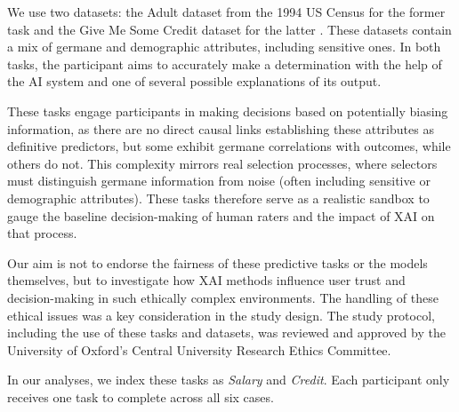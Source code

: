 \noindent We use two datasets: the Adult dataset from the 1994 US Census for the former task and the Give Me Some Credit dataset for the latter \cite{kohavi_scaling_1996, GiveMeSomeCredit}. These datasets contain a mix of germane and demographic attributes, including sensitive ones. In both tasks, the participant aims to accurately make a determination with the help of the AI system and one of several possible explanations of its output. 

These tasks engage participants in making decisions based on potentially biasing information, as there are no direct causal links establishing these attributes as definitive predictors, but some exhibit germane correlations with outcomes, while others do not. This complexity mirrors real selection processes, where selectors must distinguish germane information from noise (often including sensitive or demographic attributes). These tasks therefore serve as a realistic sandbox to gauge the baseline decision-making of human raters and the impact of XAI on that process. 

Our aim is not to endorse the fairness of these predictive tasks or the models themselves, but to investigate how XAI methods influence user trust and decision-making in such ethically complex environments. The handling of these ethical issues was a key consideration in the study design. The study protocol, including the use of these tasks and datasets, was reviewed and approved by the University of Oxford's Central University Research Ethics Committee.

In our analyses, we index these tasks as \emph{Salary} and \emph{Credit}. Each participant only receives one task to complete across all six cases.


